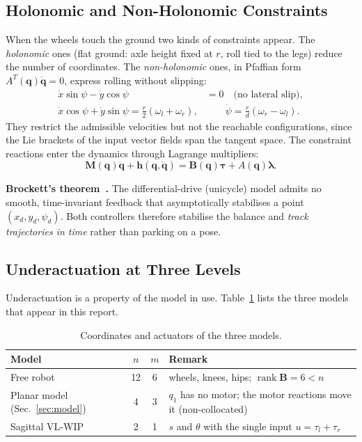 \documentclass[11pt,a4paper]{article}
\newcommand{\bq}{\bm{q}}
\newcommand{\bdq}{\dot{\bm{q}}}
\newcommand{\bddq}{\ddot{\bm{q}}}
\newcommand{\btau}{\bm{\tau}}
\newcommand{\bM}{\bm{M}}
\newcommand{\bB}{\bm{B}}
\begin{document}
\subsection{Holonomic and Non-Holonomic Constraints}

When the wheels touch the ground two kinds of constraints appear.  The \emph{holonomic} ones
(flat ground: axle height fixed at $r$, roll tied to the legs) reduce the number of
coordinates.  The \emph{non-holonomic} ones, in Pfaffian form $A^T(\bq)\bdq = 0$, express
rolling without slipping:
\begin{align}
    \dot x\sin\psi - \dot y\cos\psi &= 0 \quad\text{(no lateral slip)},\\
    \dot x\cos\psi + \dot y\sin\psi = \tfrac{r}{2}(\omega_l+\omega_r), &\qquad
    \dot\psi = \tfrac{r}{d}(\omega_r-\omega_l).
\end{align}
They restrict the admissible velocities but not the reachable configurations, since the Lie
brackets of the input vector fields span the tangent space.  The constraint reactions enter
the dynamics through Lagrange multipliers:
\begin{equation}
    \bM(\bq)\bddq + \bm{h}(\bq,\bdq) = \bB(\bq)\btau + A(\bq)\bm{\lambda}.
\end{equation}

\textbf{Brockett's theorem~\cite{brockett1983}.}  The differential-drive (unicycle) model admits no smooth,
time-invariant feedback that asymptotically stabilises a point $(x_d, y_d, \psi_d)$.  Both
controllers therefore stabilise the balance and \emph{track trajectories in time} rather than
parking on a pose.

\subsection{Underactuation at Three Levels}

Underactuation is a property of the model in use.  Table~\ref{tab:underact} lists the three
models that appear in this report.

\begin{table}[H]
    \centering
    \caption{Coordinates and actuators of the three models.}
    \label{tab:underact}
    \begin{tabular}{lccp{7cm}}
        \toprule
        Model & $n$ & $m$ & Remark \\
        \midrule
        Free robot & 12 & 6 & wheels, knees, hips; $\operatorname{rank}\bB = 6 < n$ \\
        Planar model (Sec.~\ref{sec:model}) & 4 & 3 & $q_1$ has no motor; the motor reactions move it (non-collocated) \\
        Sagittal VL-WIP & 2 & 1 & $s$ and $\theta$ with the single input $u=\tau_l+\tau_r$ \\
        \bottomrule
    \end{tabular}
\end{table}
\end{document}
